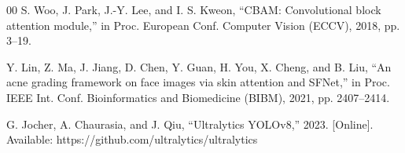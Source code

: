 \documentclass[conference]{IEEEtran}
\begin{document}
\begin{thebibliography}{00}
 S. Woo, J. Park, J.-Y. Lee, and I. S. Kweon, “CBAM: Convolutional block attention module,” in Proc. European Conf. Computer Vision (ECCV), 2018, pp. 3–19.

 Y. Lin, Z. Ma, J. Jiang, D. Chen, Y. Guan, H. You, X. Cheng, and B. Liu, “An acne grading framework on face images via skin attention and SFNet,” in Proc. IEEE Int. Conf. Bioinformatics and Biomedicine (BIBM), 2021, pp. 2407–2414.

 G. Jocher, A. Chaurasia, and J. Qiu, “Ultralytics YOLOv8,” 2023. [Online]. Available: https://github.com/ultralytics/ultralytics

\end{thebibliography}
\end{document}
